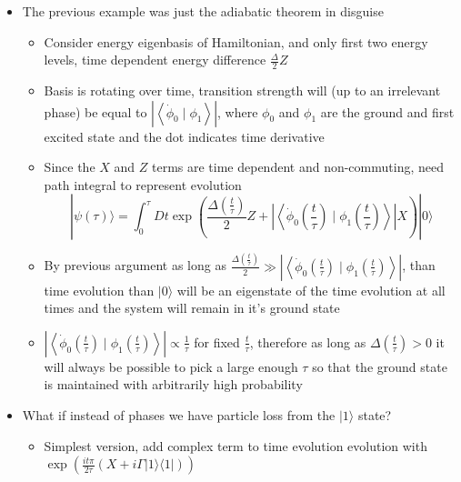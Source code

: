 \documentclass[english]{article}
\newcommand{\ket}[1]{|#1 \rangle}
\newcommand{\braket}[2]{\left \langle #1 \mid #2 \right \rangle}
\newcommand{\ketbra}[2]{\vert #1 \rangle \! \langle #2 \vert}
\begin{document}
\begin{itemize}
\begin{itemize}
\item Taking $\lambda_{-}$, we see that $\frac{v_1}{v_0}\rightarrow 0$ as $\Delta \rightarrow \infty$
\item This implies that for large $\Delta$, $\ket{0}$ is an eigenstate of $X-\frac{\Delta}{2} Z$, since exponential of matrix is diagonal in same basis, it is also an eigenstate of $\exp\left(\frac{i t \pi }{2 \tau} (X-\frac{\Delta}{2} Z)\right)$ for any $t$, therefore never leaves $\ket{0}$
\end{itemize}
\item The previous example was just the adiabatic theorem in disguise
\begin{itemize}
\item Consider energy eigenbasis of Hamiltonian, and only first two energy levels, time dependent energy difference $\frac{\Delta}{2}Z$
\item Basis is rotating over time, transition strength will (up to an irrelevant phase) be equal to $\left|\braket{\dot{\phi}_0}{\phi_1}\right|$, where $\phi_0$ and $\phi_1$ are the ground and first excited state and the dot indicates time derivative
\item Since the $X$ and $Z$ terms are time dependent and non-commuting, need path integral to represent evolution
\begin{equation}
\ket{\psi(\tau)}=\int_0^\tau Dt \exp\left(\frac{\Delta(\frac{t}{\tau})}{2}Z+\left|\braket{\dot{\phi}_0(\frac{t}{\tau})}{\phi_1(\frac{t}{\tau})}\right|X\right)\ket{0}
\end{equation}
\item By previous argument as long as $\frac{\Delta(\frac{t}{\tau})}{2}\gg\left|\braket{\dot{\phi}_0(\frac{t}{\tau})}{\phi_1(\frac{t}{\tau})}\right|$, than time evolution than $\ket{0}$ will be an eigenstate of the time evolution at all times and the system will remain in it's ground state
\item $\left|\braket{\dot{\phi}_0(\frac{t}{\tau})}{\phi_1(\frac{t}{\tau})}\right| \propto \frac{1}{\tau}$ for fixed $\frac{t}{\tau}$, therefore as long as $\Delta(\frac{t}{\tau})>0$ it will always be possible to pick a large enough $\tau$ so that the ground state is maintained with arbitrarily high probability
\end{itemize}
\item What if instead of phases we have particle loss from the $\ket{1}$ state?  
\begin{itemize}
\item Simplest version, add complex term to time evolution evolution with $\exp\left(\frac{i t \pi }{2 \tau} (X+i\Gamma\ketbra{1}{1})\right)$

\end{itemize}
\end{itemize}
\end{document}
